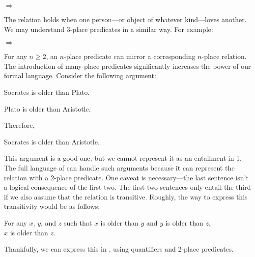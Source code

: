 \begin{menumerate}
		\item {} $\Rightarrow$ 
\end{menumerate}

\noindent{}The  relation holds when one person---or object of whatever kind---loves another.  We may understand 3-place predicates in a similar way.  For example:

\begin{menumerate}
	\item {} $\Rightarrow$ 
\end{menumerate}

For any $n\geq2$, an $n$-place predicate can mirror a corresponding $n$-place relation.  The introduction of many-place predicates significantly increases the power of our formal language.  Consider the following argument:

\begin{menumerate}
\item Socrates is older than Plato.
\item Plato is older than Aristotle.

Therefore,

\item Socrates is older than Aristotle.
\end{menumerate}

\noindent{}This argument is a good one, but we cannot represent it as an entailment in \GQL{}1.  The full language of \GQL{} can handle such arguments because it can represent the  relation with a 2-place predicate.  One caveat is necessary---the last sentence isn't a logical consequence of the first two.  The first two sentences only entail the third if we also assume that the  relation is transitive.  Roughly, the way to express this transitivity would be as follows:

\begin{center}
For any $x$, $y$, and $z$ such that $x$ is older than $y$ and $y$ is older than $z$, \\ $x$ is older than $z$.
\end{center}

\noindent{}Thankfully, we can express this in \GQL{}, using quantifiers and 2-place predicates.

